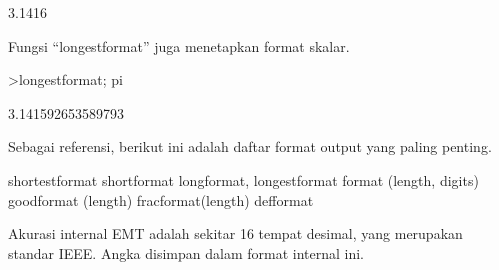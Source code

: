 \documentclass[a4paper,10pt]{article}
\begin{document}
\begin{eulernotebook}
\begin{euleroutput}
  3.1416
\end{euleroutput}
\begin{eulercomment}
Fungsi “longestformat” juga menetapkan format skalar.
\end{eulercomment}
\begin{eulerprompt}
>longestformat; pi
\end{eulerprompt}
\begin{euleroutput}
  3.141592653589793
\end{euleroutput}
\begin{eulercomment}
Sebagai referensi, berikut ini adalah daftar format output yang paling
penting.

\end{eulercomment}
\begin{eulerttcomment}
 shortestformat shortformat longformat, longestformat
 format (length, digits) goodformat (length)
 fracformat(length)
 defformat
\end{eulerttcomment}
\begin{eulercomment}

Akurasi internal EMT adalah sekitar 16 tempat desimal, yang merupakan
standar IEEE. Angka disimpan dalam format internal ini.


\end{eulercomment}
\end{eulernotebook}
\end{document}
